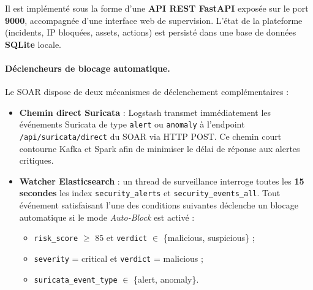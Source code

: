\documentclass[12pt,a4paper,oneside]{report}
\begin{document}
	Il est implémenté sous la forme d'une \textbf{API REST FastAPI} exposée sur le port
	\textbf{9000}, accompagnée d'une interface web de supervision. L'état de la plateforme
	(incidents, IP bloquées, assets, actions) est persisté dans une base de données
	\textbf{SQLite} locale.
	
	\paragraph{Déclencheurs de blocage automatique.}
	
	Le SOAR dispose de deux mécanismes de déclenchement complémentaires :
	
	\begin{itemize}
		\item \textbf{Chemin direct Suricata} : Logstash transmet immédiatement les événements
		Suricata de type \texttt{alert} ou \texttt{anomaly} à l'endpoint
		\texttt{/api/suricata/direct} du SOAR via HTTP POST. Ce chemin court contourne
		Kafka et Spark afin de minimiser le délai de réponse aux alertes critiques.
		
		\item \textbf{Watcher Elasticsearch} : un thread de surveillance interroge toutes les
		\textbf{15 secondes} les index \texttt{security\_alerts} et
		\texttt{security\_events\_all}. Tout événement satisfaisant l'une des conditions
		suivantes déclenche un blocage automatique si le mode \textit{Auto-Block} est
		activé :
		\begin{itemize}
			\item \texttt{risk\_score} $\geq$ 85 et \texttt{verdict} $\in$ \{malicious, suspicious\} ;
			\item \texttt{severity} = critical et \texttt{verdict} = malicious ;
			\item \texttt{suricata\_event\_type} $\in$ \{alert, anomaly\}.
		\end{itemize}
	\end{itemize}
	
\end{document}
